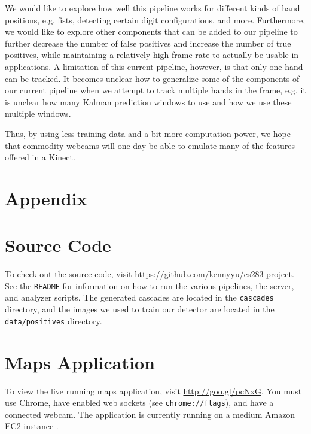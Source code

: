 \documentclass[12pt]{article}
\begin{document}
We would like to explore how well this pipeline works for different kinds of hand positions, e.g. fists, detecting certain digit configurations, and more. Furthermore, we would like to explore other components that can be added to our pipeline to further decrease the number of false positives and increase the number of true positives, while maintaining a relatively high frame rate to actually be usable in applications. A limitation of this current pipeline, however, is that only one hand can be tracked. It becomes unclear how to generalize some of the components of our current pipeline when we attempt to track multiple hands in the frame, e.g. it is unclear how many Kalman prediction windows to use and how we use these multiple windows.

Thus, by using less training data and a bit more computation power, we hope that commodity webcams will one day be able to emulate many of the features offered in a Kinect.

\section{Appendix}

\appendix
\section{Source Code}
\label{sourcecode}
To check out the source code, visit \url{https://github.com/kennyyu/cs283-project}. See the \texttt{README} for information on how to run the various pipelines, the server, and analyzer scripts. The generated cascades are located in the \texttt{cascades} directory, and the images we used to train our detector are located in the \texttt{data/positives} directory.

\section{Maps Application}
\label{mapsapp}
To view the live running maps application, visit \url{http://goo.gl/pcNxG}. You must use Chrome, have enabled web sockets (see \texttt{chrome://flags}), and have a connected webcam. The application is currently running on a medium Amazon EC2 instance \cite{ec2}.
\end{document}
